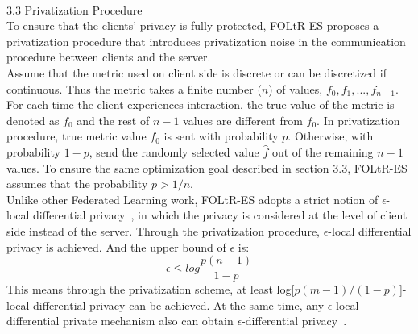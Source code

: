 \\
3.3 Privatization Procedure\\
To ensure that the clients' privacy is fully protected, FOLtR-ES proposes a privatization procedure that introduces privatization noise in the communication procedure  between clients and the server.\\
Assume that the metric used on client side is discrete or can be discretized if continuous. Thus the metric takes a finite number ($n$) of values, $f_0, f_1, ..., f_{n-1}$. For each time the client experiences interaction, the true value of the metric is denoted as $f_0$ and the rest of $n-1$ values are different from $f_0$. In privatization procedure, true metric value $f_0$ is sent with probability $p$. Otherwise, with probability $1-p$, send the randomly selected value $\hat{f}$ out of the remaining $n-1$ values. To ensure the same optimization goal described in section 3.3, FOLtR-ES assumes that the probability $p > 1/n$.\\
Unlike other Federated Learning work, FOLtR-ES adopts a strict notion of $\epsilon$-local differential privacy~\cite{}, in which the privacy is considered at the level of client side instead of the server. Through the privatization procedure, $\epsilon$-local differential privacy is achieved. And the upper bound of $\epsilon$ is:
\begin{equation}
	\epsilon \leq log\frac{p(n-1)}{1-p} 
\end{equation}
This means through the privatization scheme, at least log[$p(m-1)/(1-p)$]-local differential privacy can be achieved. At the same time, any $\epsilon$-local differential private mechanism also can obtain $\epsilon$-differential privacy~\cite{}.